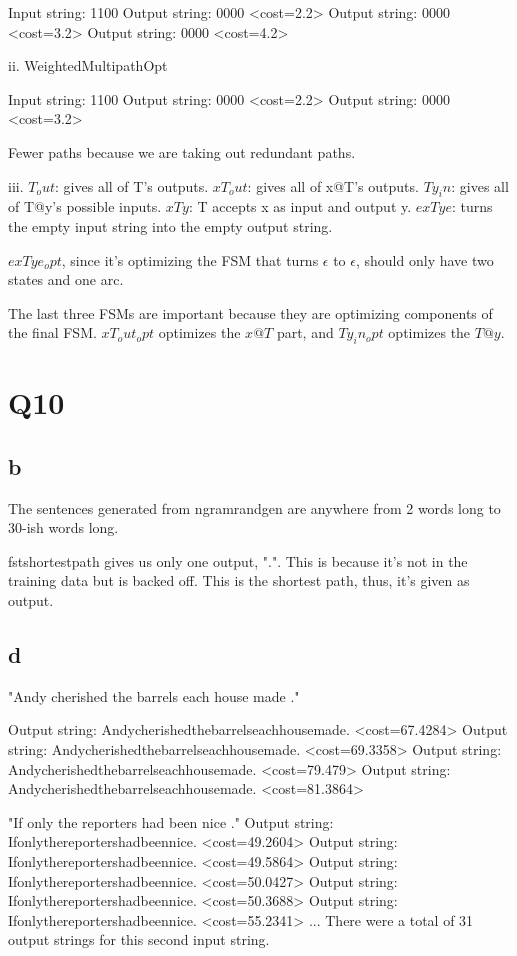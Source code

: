 \documentclass[12pt, letterpaper]{article}
\begin{document}
Input string: 1100
Output string: 0000 <cost=2.2>
Output string: 0000 <cost=3.2>
Output string: 0000 <cost=4.2>

ii. WeightedMultipathOpt

Input string: 1100
Output string: 0000 <cost=2.2>
Output string: 0000 <cost=3.2>

Fewer paths because we are taking out redundant paths. 

iii. 
$T_out$: gives all of T's outputs.
$xT_out$: gives all of x@T's outputs.
$Ty_in$: gives all of T@y's possible inputs.
$xTy$: T accepts x as input and output y.
$exTye$: turns the empty input string into the empty output string.

$exTye_opt$, since it's optimizing the FSM that turns $\epsilon$ to $\epsilon$, should only have two states and one arc. 

The last three FSMs are important because they are optimizing components of the final FSM. $xT_out_opt$ optimizes the $x @ T$ part, and $Ty_in_opt$ optimizes the $T @ y$.

\section{Q10}
\subsection{b}

The sentences generated from ngramrandgen are anywhere from 2 words long to 30-ish words long. 

fstshortestpath gives us only one output, ".". This is because it's not in the training data but is backed off. This is the shortest path, thus, it's given as output.

\subsection{d}
"Andy cherished the barrels each house made ."

Output string: Andycherishedthebarrelseachhousemade. <cost=67.4284>
Output string: Andycherishedthebarrelseachhousemade. <cost=69.3358>
Output string: Andycherishedthebarrelseachhousemade. <cost=79.479>
Output string: Andycherishedthebarrelseachhousemade. <cost=81.3864>

"If only the reporters had been nice ."
Output string: Ifonlythereportershadbeennice. <cost=49.2604>
Output string: Ifonlythereportershadbeennice. <cost=49.5864>
Output string: Ifonlythereportershadbeennice. <cost=50.0427>
Output string: Ifonlythereportershadbeennice. <cost=50.3688>
Output string: Ifonlythereportershadbeennice. <cost=55.2341>
...
There were a total of 31 output strings for this second input string.
\end{document}
